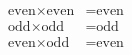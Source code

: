 \documentclass[preview]{standalone}
\begin{document}
\begin{align*}
\begin{aligned} \text{even} \times \text{even} &= \text{even} \\\text{odd} \times \text{odd} &= \text{odd} \\\text{even} \times \text{odd} &= \text{even}\end{aligned}
\end{align*}
\end{document}
